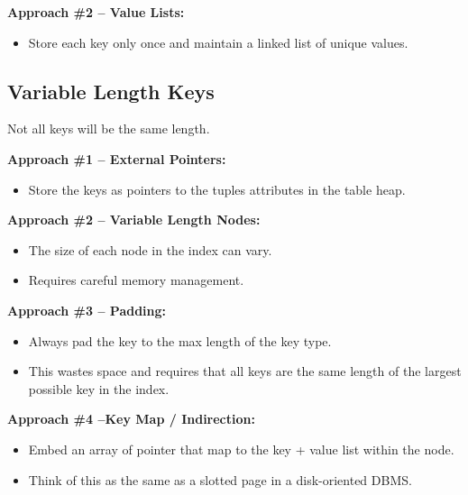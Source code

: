 \documentclass[11pt]{article}
\begin{document}
\textbf{Approach \#2 -- Value Lists:}
\begin{itemize}
    \item
    Store each key only once and maintain a linked list of unique values.
\end{itemize}

\subsection*{Variable Length Keys}
Not all keys will be the same length.

\textbf{Approach \#1 -- External Pointers:}
\begin{itemize}
    \item
    Store the keys as pointers to the tuples attributes in the table heap.
\end{itemize}

\textbf{Approach \#2 -- Variable Length Nodes:}
\begin{itemize}
    \item
    The size of each node in the index can vary.
    
    \item
    Requires careful memory management.
\end{itemize}

\textbf{Approach \#3 -- Padding:}
\begin{itemize}
    \item
    Always pad the key to the max length of the key type.
    
    \item
    This wastes space and requires that all keys are the same length of the largest possible
    key in the index.
\end{itemize}
    
\textbf{Approach \#4 --Key Map / Indirection:}
\begin{itemize}
    \item
    Embed an array of pointer that map to the key + value list within the node.
    
    \item
    Think of this as the same as a slotted page in a disk-oriented DBMS.
\end{itemize}

\end{document}
